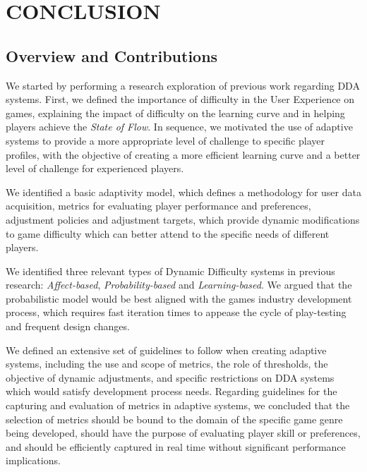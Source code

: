 \chapter{CONCLUSION}
\label{ch:conclusion}

\section{Overview and Contributions}

We started by performing a research exploration of previous work regarding DDA systems. First, we defined the importance of difficulty in the User Experience on games, explaining the impact of difficulty on the learning curve and in helping players achieve the \emph{State of Flow}. In sequence, we motivated the use of adaptive systems to provide a more appropriate level of challenge to specific player profiles, with the objective of creating a more efficient learning curve and a better level of challenge for experienced players.

We identified a basic adaptivity model, which defines a methodology for user data acquisition, metrics for evaluating player performance and preferences, adjustment policies and adjustment targets, which provide dynamic modifications to game difficulty which can better attend to the specific needs of different players.

We identified three relevant types of Dynamic Difficulty systems in previous research: \emph{Affect-based}, \emph{Probability-based} and \emph{Learning-based}. We argued that the probabilistic model would be best aligned with the games industry development process, which requires fast iteration times to appease the cycle of play-testing and frequent design changes.

We defined an extensive set of guidelines to follow when creating adaptive systems, including the use and scope of metrics, the role of thresholds, the objective of dynamic adjustments, and specific restrictions on DDA systems which would satisfy development process needs. Regarding guidelines for the capturing and evaluation of metrics in adaptive systems, we concluded that the selection of metrics should be bound to the domain of the specific game genre being developed, should have the purpose of evaluating player skill or preferences, and should be efficiently captured in real time without significant performance implications.

